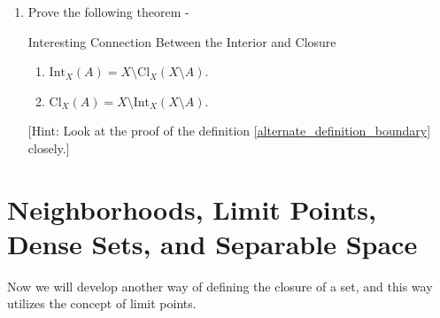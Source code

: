 \begin{enumerate}[label=\textbf{\arabic*}.]
\begin{Query}{Idempotence of Boundary of a Set}
    \end{Query}
    [Hint: From the 3rd consequence of the alternate definition of the boundary of a set, recall that $\overline{\partial A}=\partial A$. From here on, I believe you should be able to do the rest.]
    \item Prove the following theorem -
    \begin{Theorem}{Interesting Connection Between the Interior and Closure}\label{interesting_connection_between_the_interior_and_closure}
    	\begin{enumerate}[leftmargin=0.5cm]
    		\item \( \mathrm{Int}_X (A) = X \setminus \mathrm{Cl}_X (X \setminus A) \).
    		\item \( \mathrm{Cl}_X (A) = X \setminus \mathrm{Int}_X (X \setminus A) \).
    	\end{enumerate}
    \end{Theorem}
    [Hint: Look at the proof of the definition \eqref{alternate_definition_boundary} closely.]
\end{enumerate}
\section{Neighborhoods, Limit Points, Dense Sets, and Separable Space}
Now we will develop another way of defining the closure of a set, and this way utilizes the concept of limit points.
